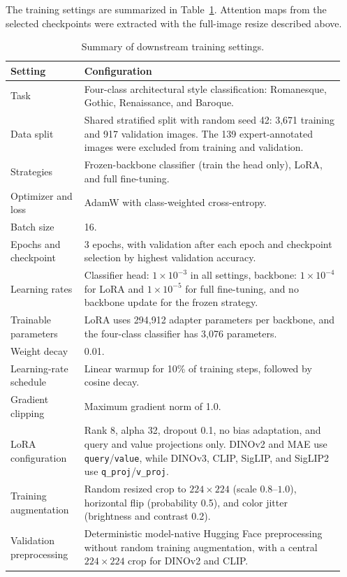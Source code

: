\documentclass[lineno,pdflatex,sn-mathphys-num]{sn-jnl}%
\theoremstyle{thmstyleone}%
\theoremstyle{thmstyletwo}%
\theoremstyle{thmstylethree}%
\begin{document}
The training settings are summarized in Table~\ref{table implementation settings}. Attention maps from the selected checkpoints were extracted with the full-image resize described above.

\begin{table}[!h]
\caption{Summary of downstream training settings.\label{table implementation settings}}
\begin{tabular}{p{0.21\linewidth}p{0.74\linewidth}}
\hline
Setting & Configuration \\ \hline
Task & Four-class architectural style classification: Romanesque, Gothic, Renaissance, and Baroque. \\
Data split & Shared stratified split with random seed 42: 3,671 training and 917 validation images. The 139 expert-annotated images were excluded from training and validation. \\
Strategies & Frozen-backbone classifier (train the head only), LoRA, and full fine-tuning. \\
Optimizer and loss & AdamW with class-weighted cross-entropy. \\
Batch size & 16. \\
Epochs and checkpoint & 3 epochs, with validation after each epoch and checkpoint selection by highest validation accuracy. \\
Learning rates & Classifier head: $1 \times 10^{-3}$ in all settings, backbone: $1 \times 10^{-4}$ for LoRA and $1 \times 10^{-5}$ for full fine-tuning, and no backbone update for the frozen strategy. \\
Trainable parameters & LoRA uses 294,912 adapter parameters per backbone, and the four-class classifier has 3,076 parameters. \\
Weight decay & 0.01. \\
Learning-rate schedule & Linear warmup for 10\% of training steps, followed by cosine decay. \\
Gradient clipping & Maximum gradient norm of 1.0. \\
LoRA configuration & Rank 8, alpha 32, dropout 0.1, no bias adaptation, and query and value projections only. DINOv2 and MAE use \texttt{query}/\texttt{value}, while DINOv3, CLIP, SigLIP, and SigLIP2 use \texttt{q\_proj}/\texttt{v\_proj}. \\
Training augmentation & Random resized crop to $224 \times 224$ (scale $0.8$--$1.0$), horizontal flip (probability 0.5), and color jitter (brightness and contrast 0.2). \\
Validation preprocessing & Deterministic model-native Hugging Face preprocessing without random training augmentation, with a central $224 \times 224$ crop for DINOv2 and CLIP. \\ \hline
\end{tabular}
\end{table}
\end{document}
